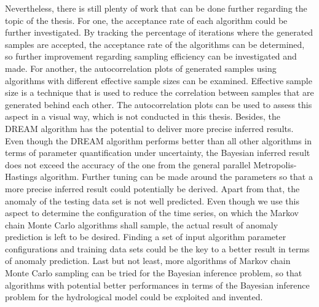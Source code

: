 Nevertheless, there is still plenty of work that can be done further regarding the topic of the thesis. For one, the acceptance rate of each algorithm could be further investigated. By tracking the percentage of iterations where the generated samples are accepted, the acceptance rate of the algorithms can be determined, so further improvement regarding sampling efficiency can be investigated and made. For another, the autocorrelation plots of generated samples using algorithms with different effective sample sizes can be examined. Effective sample size is a technique that is used to reduce the correlation between samples that are generated behind each other. The autocorrelation plots can be used to assess this aspect in a visual way, which is not conducted in this thesis. Besides, the DREAM algorithm has the potential to deliver more precise inferred results. Even though the DREAM algorithm performs better than all other algorithms in terms of parameter quantification under uncertainty, the Bayesian inferred result does not exceed the accuracy of the one from the general parallel Metropolis-Hastings algorithm. Further tuning can be made around the parameters so that a more precise inferred result could potentially be derived. Apart from that, the anomaly of the testing data set is not well predicted. Even though we use this aspect to determine the configuration of the time series, on which the Markov chain Monte Carlo algorithms shall sample, the actual result of anomaly prediction is left to be desired. Finding a set of input algorithm parameter configurations and training data sets could be the key to a better result in terms of anomaly prediction. Last but not least, more algorithms of Markov chain Monte Carlo sampling can be tried for the Bayesian inference problem, so that algorithms with potential better performances in terms of the Bayesian inference problem for the hydrological model could be exploited and invented.
